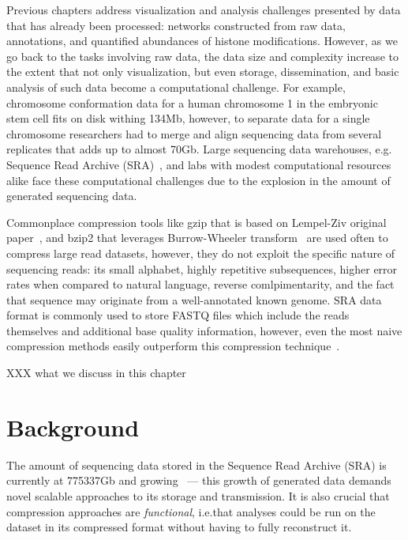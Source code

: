 \documentclass[12pt]{cmuthesis}
\begin{document}
Previous chapters address visualization and analysis challenges presented by data that has already been processed: networks constructed from raw data, annotations, and quantified abundances of histone modifications. However, as we go back to the tasks involving raw data, the data size and complexity increase to the extent that not only visualization, but even storage, dissemination, and basic analysis of such data become a computational challenge. For example, chromosome conformation data for a human chromosome 1 in the embryonic stem cell fits on disk withing 134Mb, however, to separate data for a single chromosome researchers had to merge and align sequencing data from several replicates that adds up to almost 70Gb. 
Large sequencing data warehouses, e.g. Sequence Read Archive (SRA)~\cite{SRA}, and labs with modest computational resources alike face these computational challenges due to the explosion in the amount of generated sequencing data.

Commonplace compression tools like gzip that is based on Lempel-Ziv original paper~\cite{LempelZiv77}, and bzip2 that leverages Burrow-Wheeler transform~\cite{BWTransform} are used often to compress large read datasets, however, they do not exploit the specific nature of sequencing reads: its small alphabet, highly repetitive subsequences, higher error rates when compared to natural language, reverse comlpimentarity, and the fact that sequence may originate from a well-annotated known genome. SRA data format is commonly used to store FASTQ files which include the reads themselves and additional base quality information, however, even the most naive compression methods easily outperform this compression technique~\cite{SeqSqueeze}.

XXX what we discuss in this chapter


\section{Background}


The amount of sequencing data stored in the Sequence Read Archive (SRA) is currently at 775337Gb and growing~\cite{SRA} --- this growth of generated data demands novel scalable approaches to its storage and transmission. It is also crucial that compression approaches are \textit{functional}, i.e.\@ that analyses could be run on the dataset in its compressed format without having to fully reconstruct it. 
\end{document}

